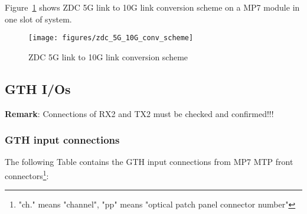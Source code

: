 Figure~\ref{fig:app:zdc_5G_10G_conv_scheme} shows ZDC 5G link to 10G link conversion scheme on a MP7 module in one slot of \gt system.\\

\begin{figure}[htb]
\centering
\texttt{[image: figures/zdc\_5G\_10G\_conv\_scheme]}
\caption{ZDC 5G link to 10G link conversion scheme}
\label{fig:app:zdc_5G_10G_conv_scheme}
\end{figure}

\clearpage
\subsection{GTH I/Os}\label{sec:app:gth_io}

\textbf{Remark}:
Connections of RX2 and TX2 must be checked and confirmed!!!

\subsubsection{GTH input connections}\label{sec:app:gth_i_conn}

The following Table contains the GTH input connections from MP7 MTP front connectors\footnote{"ch." means "channel", "pp" means "optical patch panel connector number"}:

